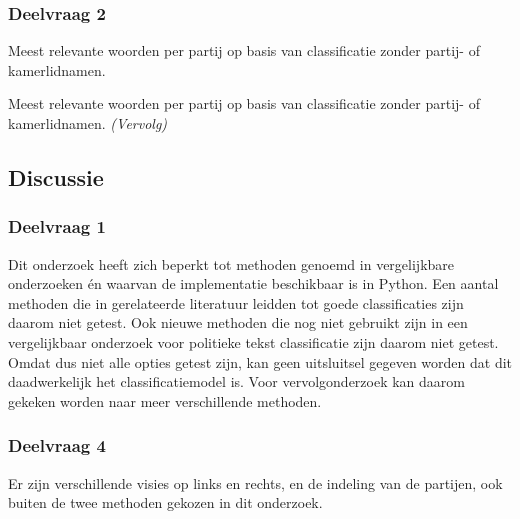 \subsubsection{Deelvraag 2}
\begin{table}[H] 
\caption{Meest relevante woorden per partij op basis van classificatie zonder partij- of kamerlidnamen.} 
\label{tab:MostImportantWordsWithoutNames} 
\centering 
 
\end{table} 
\addtocounter{table}{-1} 
\begin{table}[H] 
\caption{Meest relevante woorden per partij op basis van classificatie zonder partij- of kamerlidnamen. \emph{(Vervolg)}} 
\centering 
 
\end{table}

\subsection{Discussie}
\subsubsection{Deelvraag 1}
Dit onderzoek heeft zich beperkt tot methoden genoemd in vergelijkbare onderzoeken én waarvan de implementatie beschikbaar is in Python. Een aantal methoden die in gerelateerde literatuur leidden tot goede classificaties zijn daarom niet getest. Ook nieuwe methoden die nog niet gebruikt zijn in een vergelijkbaar onderzoek voor politieke tekst classificatie zijn daarom niet getest. Omdat dus niet alle opties getest zijn, kan geen uitsluitsel gegeven worden dat dit daadwerkelijk het classificatiemodel is. Voor vervolgonderzoek kan daarom gekeken worden naar meer verschillende methoden.\par



\subsubsection{Deelvraag 4}
Er zijn verschillende visies op links en rechts, en de indeling van de partijen, ook buiten de twee methoden gekozen in dit onderzoek.\par